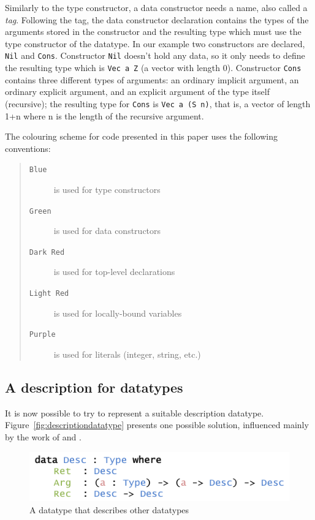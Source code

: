 \documentclass{ituthesis}
\newcommand{\ttconstructor}[1]{\textcolor{constructor-color}{\texttt{#1}}}
\newcommand{\tttype}[1]{\textcolor{type-color}{\texttt{#1}}}
\newcommand{\ttdec}[1]{\textcolor{declared-var-color}{\texttt{#1}}}
\newcommand{\ttvar}[1]{\textcolor{local-var-color}{\texttt{#1}}}
\newcommand{\ttliteral}[1]{\textcolor{literal-color}{\texttt{#1}}}
\theoremstyle{definition}
\newenvironment{asideblock}
  {\begin{mdframed}[style=0,%
      leftline=false,rightline=false,leftmargin=2em,rightmargin=2em,%
          innerleftmargin=0pt,innerrightmargin=0pt,linewidth=0.75pt,%
      skipabove=7pt,skipbelow=7pt]\small}
  {\end{mdframed}}
\begin{document}
Similarly to the type constructor, a data constructor needs a name, also called a \textit{tag}.
Following the tag, the data constructor declaration contains the types of the arguments stored in the constructor and the resulting type which must use the type constructor of the datatype.
In our example two constructors are declared, \ttconstructor{Nil} and \ttconstructor{Cons}.
Constructor \ttconstructor{Nil} doesn't hold any data, so it only needs to define the resulting type which is \tttype{Vec}~\ttvar{a}~\ttconstructor{Z} (a vector with length 0).
Constructor \ttconstructor{Cons} contains three different types of arguments: an ordinary implicit argument, an ordinary explicit argument, and an explicit argument of the type itself (recursive); the resulting type for \ttconstructor{Cons} is \tttype{Vec}~\ttvar{a}~\texttt{(}\ttconstructor{S}~\ttvar{n}\texttt{)}, that is, a vector of length 1+n where n is the length of the recursive argument.

\begin{asideblock}
  The colouring scheme for code presented in this paper uses the following conventions:
  \begin{quote}
  \begin{description}
    \item[\tttype{Blue}] is used for type constructors
    \item[\ttconstructor{Green}] is used for data constructors
    \item[\ttdec{Dark Red}] is used for top-level declarations
    \item[\ttvar{Light Red}] is used for locally-bound variables
    \item[\ttliteral{Purple}] is used for literals (integer, string, etc.)
  \end{description}
  \end{quote}

\end{asideblock}

\subsection{A description for datatypes}
\label{sub:ADescriptionforDatatypes}
It is now possible to try to represent a suitable description datatype. Figure~\ref{fig:descriptiondatatype} presents one possible solution, influenced mainly by the work of \cite{mcbride2010ornamental} and \cite{diehl2014eliminators}.

\begin{figure}[ht]
\begin{center}
    \includegraphics[scale=0.5]{Figures/ADescriptionforDatatypesSimple.png}
\end{center}
\caption{A datatype that describes other datatypes}
\label{fig:simpldescdatatype}
\end{figure}
\end{document}
